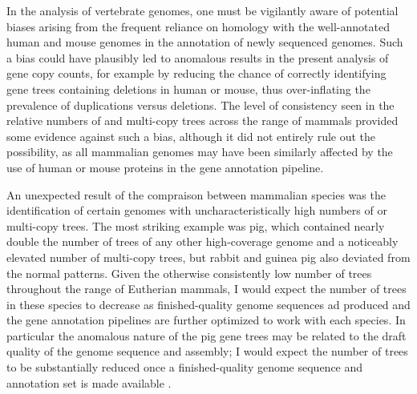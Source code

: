 In the analysis of vertebrate genomes, one must be vigilantly aware of
potential biases arising from the frequent reliance on homology with
the well-annotated human and mouse genomes in the annotation of newly
sequenced genomes. Such a bias could have plausibly led to anomalous
results in the present analysis of gene copy counts, for example by
reducing the chance of correctly identifying gene trees containing
deletions in human or mouse, thus over-inflating the prevalence of
duplications versus deletions. The level of consistency seen in the
relative numbers of \zcop and multi-copy trees across the range of
mammals provided some evidence against such a bias, although it did
not entirely rule out the possibility, as all mammalian genomes may
have been similarly affected by the use of human or mouse proteins in
the \ens gene annotation pipeline.

An unexpected result of the compraison between mammalian species was
the identification of certain genomes with uncharacteristically high
numbers of \zcop or multi-copy trees. The most striking example was
pig, which contained nearly double the number of \zcop trees of any
other high-coverage \mammln genome and a noticeably elevated number of
multi-copy trees, but rabbit and guinea pig also deviated from the
normal patterns. Given the otherwise consistently low number of \zcop
trees throughout the range of Eutherian mammals, I would expect the
number of \zcop trees in these species to decrease as finished-quality
genome sequences ad produced and the gene annotation pipelines are
further optimized to work with each species. In particular the
anomalous nature of the pig gene trees may be related to the draft
quality of the genome sequence and assembly; I would expect the number
of \zcop trees to be substantially reduced once a finished-quality
genome sequence and annotation set is made available
\citep{Archibald2010}.

